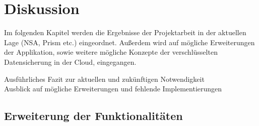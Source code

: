 \documentclass[12pt,a4paper,bibliography=totocnumbered,listof=totocnumbered]{scrartcl}
\begin{document}
\section{Diskussion}
Im folgenden Kapitel werden die Ergebnisse der Projektarbeit in der aktuellen Lage (NSA, Prism etc.) eingeordnet. Außerdem wird auf mögliche Erweiterungen der Applikation, sowie weitere mögliche Konzepte der verschlüsselten Datensicherung in der Cloud, eingegangen. 

Ausführliches Fazit zur aktuellen und zukünftigen Notwendigkeit\\
Ausblick auf mögliche Erweiterungen und fehlende Implementierungen

\subsection{Erweiterung der Funktionalitäten}
\end{document}
